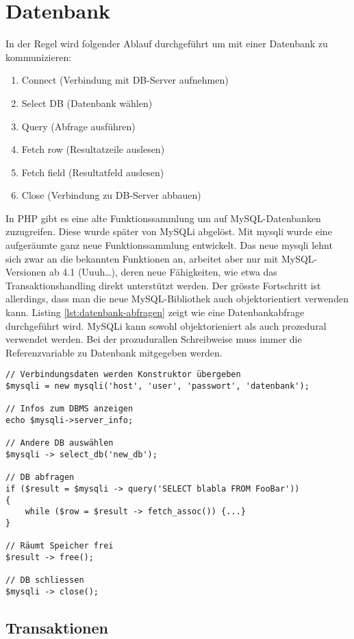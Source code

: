 \section{Datenbank}

In der Regel wird folgender Ablauf durchgeführt um mit einer Datenbank zu kommunizieren:
\begin{enumerate}
	\item Connect (Verbindung mit DB-Server aufnehmen)
	\item Select DB (Datenbank wählen)
	\item Query (Abfrage ausführen)
	\item Fetch row (Resultatzeile auslesen)
	\item Fetch field (Resultatfeld auslesen)
	\item Close (Verbindung zu DB-Server abbauen)
\end{enumerate}
In PHP gibt es eine alte Funktionssammlung um auf MySQL-Datenbanken zuzugreifen. Diese wurde später von MySQLi abgelöst. Mit mysqli wurde eine aufgeräumte ganz neue Funktionssammlung entwickelt. Das neue mysqli lehnt sich zwar an die bekannten Funktionen an, arbeitet aber nur mit MySQL-Versionen ab 4.1 (Uuuh\dots), deren neue Fähigkeiten, wie etwa das Transaktionshandling direkt unterstützt werden. Der grösste Fortschritt ist allerdings, dass man die neue MySQL-Bibliothek auch objektorientiert verwenden kann. Listing \ref{lst:datenbank-abfragen} zeigt wie eine Datenbankabfrage durchgeführt wird. MySQLi kann sowohl objektorieniert als auch prozedural verwendet werden. Bei der prozudurallen Schreibweise muss immer die Referenzvariable zu Datenbank mitgegeben werden.

\begin{lstlisting}[caption=Datenbank abfragen, label=lst:datenbank-abfragen]
// Verbindungsdaten werden Konstruktor übergeben
$mysqli = new mysqli('host', 'user', 'passwort', 'datenbank');

// Infos zum DBMS anzeigen
echo $mysqli->server_info;

// Andere DB auswählen
$mysqli -> select_db('new_db');

// DB abfragen
if ($result = $mysqli -> query('SELECT blabla FROM FooBar')) 
{
	while ($row = $result -> fetch_assoc()) {...}
}

// Räumt Speicher frei
$result -> free();

// DB schliessen
$mysqli -> close();
\end{lstlisting}

\subsection{Transaktionen}

